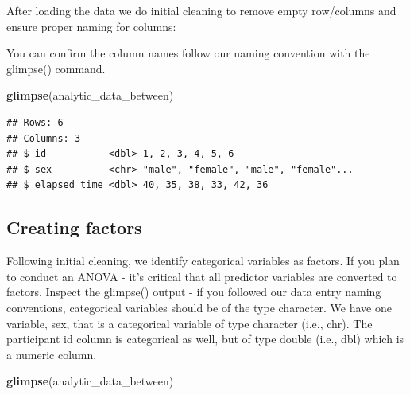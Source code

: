 \documentclass[
]{krantz}
\makeatletter
\newenvironment{Shaded}{\begin{snugshade}}{\end{snugshade}}
\newcommand{\CommentTok}[1]{\textcolor[rgb]{0.37,0.37,0.37}{\textit{#1}}}
\newcommand{\KeywordTok}[1]{\textcolor[rgb]{0.27,0.27,0.27}{\textbf{#1}}}
\newcommand{\NormalTok}[1]{#1}
\newcommand{\OperatorTok}[1]{\textcolor[rgb]{0.43,0.43,0.43}{\textbf{#1}}}
\newcommand{\StringTok}[1]{\textcolor[rgb]{0.5,0.5,0.5}{#1}}
\newenvironment{kframe}{%
\medskip{}
\setlength{\fboxsep}{.8em}
 \def\at@end@of@kframe{}%
 \ifinner\ifhmode%
  \def\at@end@of@kframe{\end{minipage}}%
  \begin{minipage}{\columnwidth}%
 \fi\fi%
 \def\FrameCommand##1{\hskip\@totalleftmargin \hskip-\fboxsep
 \colorbox{shadecolor}{##1}\hskip-\fboxsep
     \hskip-\linewidth \hskip-\@totalleftmargin \hskip\columnwidth}%
 \MakeFramed {\advance\hsize-\width
   \@totalleftmargin\z@ \linewidth\hsize
   \@setminipage}}%
 {\par\unskip\endMakeFramed%
 \at@end@of@kframe}
\renewenvironment{Shaded}{\begin{kframe}}{\end{kframe}}
\makeatother
\begin{document}
After loading the data we do initial cleaning to remove empty row/columns and ensure proper naming for columns:

\begin{Shaded}
\end{Shaded}

You can confirm the column names follow our naming convention with the glimpse() command.

\begin{Shaded}
\begin{Highlighting}[]
\KeywordTok{glimpse}\NormalTok{(analytic_data_between)}
\end{Highlighting}
\end{Shaded}

\begin{verbatim}
## Rows: 6
## Columns: 3
## $ id           <dbl> 1, 2, 3, 4, 5, 6
## $ sex          <chr> "male", "female", "male", "female"...
## $ elapsed_time <dbl> 40, 35, 38, 33, 42, 36
\end{verbatim}

\hypertarget{creating-factors}{%
\subsection{Creating factors}\label{creating-factors}}

Following initial cleaning, we identify categorical variables as factors. If you plan to conduct an ANOVA - it's critical that all predictor variables are converted to factors. Inspect the glimpse() output - if you followed our data entry naming conventions, categorical variables should be of the type character. We have one variable, sex, that is a categorical variable of type character (i.e., chr). The participant id column is categorical as well, but of type double (i.e., dbl) which is a numeric column.

\begin{Shaded}
\begin{Highlighting}[]
\KeywordTok{glimpse}\NormalTok{(analytic_data_between)}
\end{Highlighting}
\end{Shaded}
\end{document}

